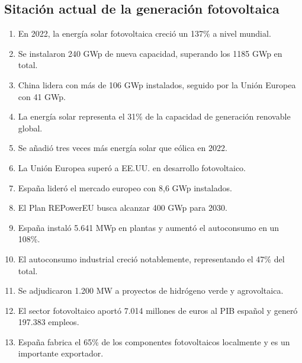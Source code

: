 \documentclass[aspectratio=169, usenames,svgnames,dvipsnames]{beamer}
\begin{document}
\subsection{Sitación actual de la generación fotovoltaica}
\label{sec:org55cfea6}
\begin{enumerate}
\item En 2022, la energía solar fotovoltaica creció un 137\% a nivel mundial.
\item Se instalaron 240 GWp de nueva capacidad, superando los 1185 GWp en total.
\item China lidera con más de 106 GWp instalados, seguido por la Unión Europea con 41 GWp.
\item La energía solar representa el 31\% de la capacidad de generación renovable global.
\item Se añadió tres veces más energía solar que eólica en 2022.
\item La Unión Europea superó a EE.UU. en desarrollo fotovoltaico.
\item España lideró el mercado europeo con 8,6 GWp instalados.
\item El Plan REPowerEU busca alcanzar 400 GWp para 2030.
\item España instaló 5.641 MWp en plantas y aumentó el autoconsumo en un 108\%.
\item El autoconsumo industrial creció notablemente, representando el 47\% del total.
\item Se adjudicaron 1.200 MW a proyectos de hidrógeno verde y agrovoltaica.
\item El sector fotovoltaico aportó 7.014 millones de euros al PIB español y generó 197.383 empleos.
\item España fabrica el 65\% de los componentes fotovoltaicos localmente y es un importante exportador.
\end{enumerate}
\end{document}

